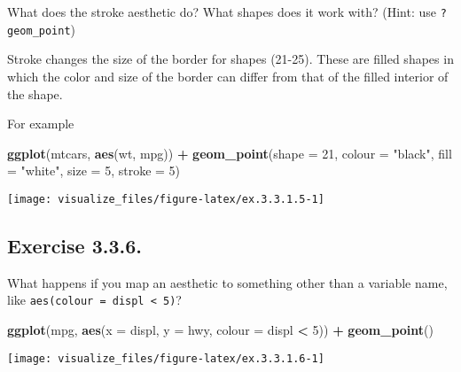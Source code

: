 \documentclass[]{book}
\newenvironment{Shaded}{\begin{snugshade}}{\end{snugshade}}
\newcommand{\DataTypeTok}[1]{\textcolor[rgb]{0.13,0.29,0.53}{#1}}
\newcommand{\DecValTok}[1]{\textcolor[rgb]{0.00,0.00,0.81}{#1}}
\newcommand{\KeywordTok}[1]{\textcolor[rgb]{0.13,0.29,0.53}{\textbf{#1}}}
\newcommand{\NormalTok}[1]{#1}
\newcommand{\OperatorTok}[1]{\textcolor[rgb]{0.81,0.36,0.00}{\textbf{#1}}}
\newcommand{\StringTok}[1]{\textcolor[rgb]{0.31,0.60,0.02}{#1}}
\theoremstyle{plain}
\theoremstyle{remark}
\begin{document}
What does the stroke aesthetic do? What shapes does it work with? (Hint:
use \texttt{?geom\_point})

Stroke changes the size of the border for shapes (21-25). These are
filled shapes in which the color and size of the border can differ from
that of the filled interior of the shape.

For example

\begin{Shaded}
\begin{Highlighting}[]
\KeywordTok{ggplot}\NormalTok{(mtcars, }\KeywordTok{aes}\NormalTok{(wt, mpg)) }\OperatorTok{+}
\StringTok{  }\KeywordTok{geom_point}\NormalTok{(}\DataTypeTok{shape =} \DecValTok{21}\NormalTok{, }\DataTypeTok{colour =} \StringTok{"black"}\NormalTok{, }\DataTypeTok{fill =} \StringTok{"white"}\NormalTok{, }\DataTypeTok{size =} \DecValTok{5}\NormalTok{, }\DataTypeTok{stroke =} \DecValTok{5}\NormalTok{)}
\end{Highlighting}
\end{Shaded}

\begin{center}\texttt{[image: visualize\_files/figure-latex/ex.3.3.1.5-1]} \end{center}

\hypertarget{exercise-3.3.6.}{%
\subsection*{\texorpdfstring{Exercise
{3.3.6}.}{Exercise 3.3.6.}}\label{exercise-3.3.6.}}

What happens if you map an aesthetic to something other than a variable
name, like \texttt{aes(colour\ =\ displ\ \textless{}\ 5)}?

\begin{Shaded}
\begin{Highlighting}[]
\KeywordTok{ggplot}\NormalTok{(mpg, }\KeywordTok{aes}\NormalTok{(}\DataTypeTok{x =}\NormalTok{ displ, }\DataTypeTok{y =}\NormalTok{ hwy, }\DataTypeTok{colour =}\NormalTok{ displ }\OperatorTok{<}\StringTok{ }\DecValTok{5}\NormalTok{)) }\OperatorTok{+}
\StringTok{  }\KeywordTok{geom_point}\NormalTok{()}
\end{Highlighting}
\end{Shaded}

\begin{center}\texttt{[image: visualize\_files/figure-latex/ex.3.3.1.6-1]} \end{center}
\end{document}
